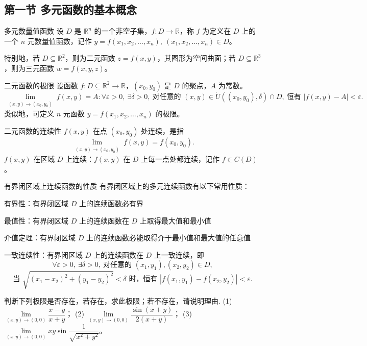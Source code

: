 \subsection{第一节 多元函数的基本概念}
\begin{dy}{多元数量值函数}{}
设 $D$ 是 $\mathbb{R}^n$ 的一个非空子集，$f: D \to \mathbb{R}$，称 $f$ 为定义在 $D$ 上的一个 $n$ 元数量值函数，记作 $y = f(x_1, x_2, \dots, x_n),\ (x_1, x_2, \dots, x_n) \in D$。

特别地，若 $D \subseteq \mathbb{R}^2$，则为二元函数 $z = f(x,y)$，其图形为空间曲面；若 $D \subseteq \mathbb{R}^3$，则为三元函数 $w = f(x,y,z)$。
\end{dy}
\begin{dy}{二元函数的极限}{}
设函数 $f: D \subseteq \mathbb{R}^2 \to \mathbb{R}$，$(x_0,y_0)$ 是 $D$ 的聚点，$A$ 为常数。
\[
\lim_{\substack{(x,y) \to (x_0,y_0)}} f(x,y) = A : \forall \varepsilon > 0,\ \exists \delta > 0,\ \text{对任意的 } (x,y) \in \mathring{U}((x_0,y_0),\delta) \cap D,\ \text{恒有 } |f(x,y) - A| < \varepsilon.
\]
类似地，可定义 $n$ 元函数 $y = f(x_1, x_2, \dots, x_n)$ 的极限。
\end{dy}
\begin{dy}{二元函数的连续性}{}
$f(x,y)$ 在点 $(x_0,y_0)$ 处连续，是指
\[
\lim_{\substack{(x,y) \to (x_0,y_0)}} f(x,y) = f(x_0,y_0).
\]
$f(x,y)$ 在区域 $D$ 上连续：$f(x,y)$ 在 $D$ 上每一点处都连续，记作 $f \in C(D)$。
\end{dy}
\begin{xz}{有界闭区域上连续函数的性质}{}
有界闭区域上的多元连续函数有以下常用性质：

    有界性：有界闭区域 $D$ 上的连续函数必有界

    最值性：有界闭区域 $D$ 上的连续函数在 $D$ 上取得最大值和最小值

    介值定理：有界闭区域 $D$ 上的连续函数必能取得介于最小值和最大值的任意值

    一致连续性：有界闭区域 $D$ 上的连续函数在 $D$ 上一致连续，即
    \[
    \forall \varepsilon > 0,\ \exists \delta > 0,\ \text{对任意的 } (x_1,y_1), (x_2,y_2) \in D,\]
    \[
    \text{当 } \sqrt{(x_1-x_2)^2 + (y_1-y_2)^2} < \delta \text{ 时，恒有 } 
    |f(x_1,y_1) - f(x_2,y_2)| < \varepsilon.
    \]
\end{xz}
\begin{problem}
    判断下列极限是否存在，若存在，求此极限；若不存在，请说明理由.
(1) $\lim\limits_{(x,y)\to(0,0)} \dfrac{x-y}{x+y}$；
(2) $\lim\limits_{(x,y)\to(0,0)} \dfrac{\sin(x+y)}{2(x+y)}$；
(3) $\lim\limits_{(x,y)\to(0,0)} xy\sin\dfrac{1}{\sqrt{x^2+y^2}}$。
\end{problem}
